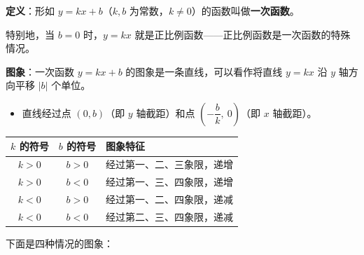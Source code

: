 \documentclass[12pt, a4paper]{ctexart}
\begin{document}
\begin{knowledgebox}[一次函数的定义与图象]
\textbf{定义}：形如 $y = kx + b$（$k,b$ 为常数，$k\neq 0$）的函数叫做\textbf{一次函数}。

特别地，当 $b=0$ 时，$y=kx$ 就是正比例函数——正比例函数是一次函数的特殊情况。

\textbf{图象}：一次函数 $y=kx+b$ 的图象是一条直线，可以看作将直线 $y=kx$ 沿 $y$ 轴方向平移 $|b|$ 个单位。
\begin{itemize}[leftmargin=2em]
  \item 直线经过点 $(0, b)$（即 $y$ 轴截距）和点 $\left(-\dfrac{b}{k},\ 0\right)$（即 $x$ 轴截距）。
\end{itemize}
\end{knowledgebox}

\begin{knowledgebox}
\begin{center}
\renewcommand{\arraystretch}{1.4}
\begin{tabular}{|c|c|l|}
\hline
\textbf{$k$ 的符号} & \textbf{$b$ 的符号} & \textbf{图象特征} \\
\hline
$k>0$ & $b>0$ & 经过第一、二、三象限，递增 \\
\hline
$k>0$ & $b<0$ & 经过第一、三、四象限，递增 \\
\hline
$k<0$ & $b>0$ & 经过第一、二、四象限，递减 \\
\hline
$k<0$ & $b<0$ & 经过第二、三、四象限，递减 \\
\hline
\end{tabular}
\end{center}
\end{knowledgebox}

下面是四种情况的图象：
\end{document}
